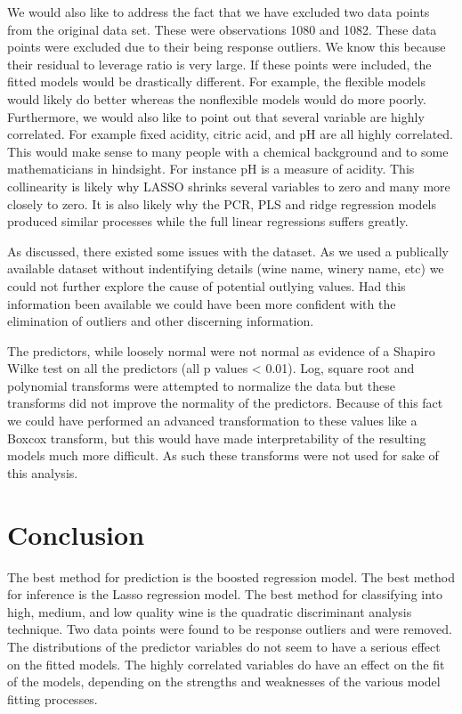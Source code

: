 \documentclass[]{article}
\begin{document}
We would also like to address the fact that we have excluded two data
points from the original data set. These were observations 1080 and
1082. These data points were excluded due to their being response
outliers. We know this because their residual to leverage ratio is very
large. If these points were included, the fitted models would be
drastically different. For example, the flexible models would likely do
better whereas the nonflexible models would do more poorly. Furthermore,
we would also like to point out that several variable are highly
correlated. For example fixed acidity, citric acid, and pH are all
highly correlated. This would make sense to many people with a chemical
background and to some mathematicians in hindsight. For instance pH is a
measure of acidity. This collinearity is likely why LASSO shrinks
several variables to zero and many more closely to zero. It is also
likely why the PCR, PLS and ridge regression models produced similar
processes while the full linear regressions suffers greatly.

As discussed, there existed some issues with the dataset. As we used a
publically available dataset without indentifying details (wine name,
winery name, etc) we could not further explore the cause of potential
outlying values. Had this information been available we could have been
more confident with the elimination of outliers and other discerning
information.

The predictors, while loosely normal were not normal as evidence of a
Shapiro Wilke test on all the predictors (all p values \textless{}
0.01). Log, square root and polynomial transforms were attempted to
normalize the data but these transforms did not improve the normality of
the predictors. Because of this fact we could have performed an advanced
transformation to these values like a Boxcox transform, but this would
have made interpretability of the resulting models much more difficult.
As such these transforms were not used for sake of this analysis.

\section{Conclusion}\label{conclusion}

The best method for prediction is the boosted regression model. The best
method for inference is the Lasso regression model. The best method for
classifying into high, medium, and low quality wine is the quadratic
discriminant analysis technique. Two data points were found to be
response outliers and were removed. The distributions of the predictor
variables do not seem to have a serious effect on the fitted models. The
highly correlated variables do have an effect on the fit of the models,
depending on the strengths and weaknesses of the various model fitting
processes.
\end{document}

